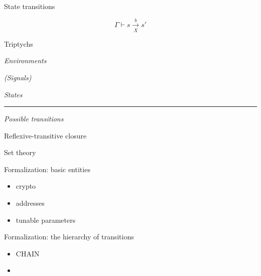 \documentclass[aspectratio=169]{beamer}
\begin{document}
\begin{frame}{State transitions}
\begin{center}
\[ Γ ⊢ s \xrightarrow[X]{b} s' \]
\end{center}
\vfill
\transitionType{}
\end{frame}

\begin{frame}{Triptychs}
\begin{minipage}{.4\textwidth}
\emph{Environments}

\emph{(Signals)}
\end{minipage}
\hfill\vrule\hfill
\begin{minipage}{.4\textwidth}
\emph{States}
\end{minipage}
\hrule
\centering
\vspace{2pt}
\emph{Possible transitions}
\end{frame}

\begin{frame}{Reflexive-transitive closure}
\rtClosure{}
\end{frame}

\begin{frame}{Set theory}
\setTheory{}
\end{frame}

\begin{frame}{Formalization: basic entities}
\begin{itemize}
\item crypto
\item addresses
\item tunable parameters
\end{itemize}
\end{frame}

\begin{frame}{Formalization: the hierarchy of transitions}
\begin{itemize}
\item CHAIN
\item
\end{itemize}
\end{frame}
\end{document}
